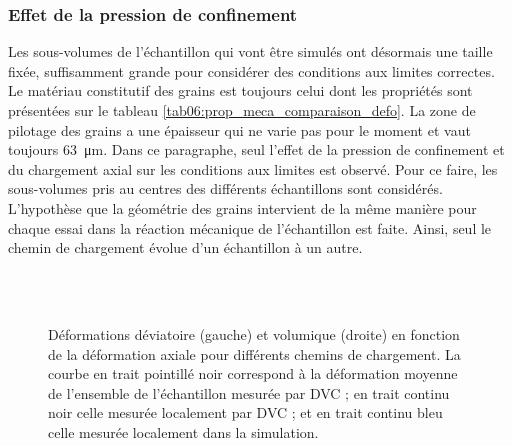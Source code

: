 		\subsubsection{Effet de la pression de confinement}
			Les sous-volumes de l'échantillon qui vont être simulés ont désormais une taille fixée, suffisamment grande pour considérer des conditions aux limites correctes. Le matériau constitutif des grains est toujours celui dont les propriétés sont présentées sur le tableau \ref{tab06:prop_meca_comparaison_defo}. La zone de pilotage des grains a une épaisseur qui ne varie pas pour le moment et vaut toujours \SI{63}{\micro\meter}. Dans ce paragraphe, seul l'effet de la pression de confinement et du chargement axial sur les conditions aux limites est observé. Pour ce faire, les sous-volumes pris au centres des différents échantillons sont considérés. L'hypothèse que la géométrie des grains intervient de la même manière pour chaque essai dans la réaction mécanique de l'échantillon est faite. Ainsi, seul le chemin de chargement évolue d'un échantillon à un autre.
			\begin{figure}\centering
				\\
				\\
				\caption{\label{fig06:comparaison_defo_chargement}Déformations déviatoire (gauche) et volumique (droite) en fonction de la déformation axiale pour différents chemins de chargement. La courbe en trait pointillé noir correspond à la déformation moyenne de l'ensemble de l'échantillon mesurée par DVC ; en trait continu noir celle mesurée localement par DVC ; et en trait continu bleu celle mesurée localement dans la simulation.}
			\end{figure}
